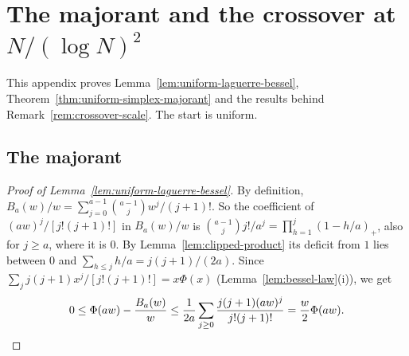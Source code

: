 \section{The majorant and the crossover at \texorpdfstring{$N/(\log N)^2$}{N/(log N)\^{}2}}
\label{app:boundary}

This appendix proves Lemma~\ref{lem:uniform-laguerre-bessel},
Theorem~\ref{thm:uniform-simplex-majorant} and the results behind
Remark~\ref{rem:crossover-scale}. The start is uniform.

\subsection{The majorant}

\begin{proof}[Proof of Lemma~\ref{lem:uniform-laguerre-bessel}]
By definition, $B_a(w)/w=\sum_{j=0}^{a-1}\binom{a-1}j w^j/(j+1)!$. So the
coefficient of $(aw)^j/[j!(j+1)!]$ in $B_a(w)/w$ is
$\binom{a-1}jj!/a^j=\prod_{h=1}^j(1-h/a)_+$, also for $j\ge a$, where it is $0$.
By Lemma~\ref{lem:clipped-product} its deficit from $1$ lies between $0$ and
$\sum_{h\le j}h/a=j(j+1)/(2a)$. Since $\sum_jj(j+1)x^j/[j!(j+1)!]=x\Phi(x)$
(Lemma~\ref{lem:bessel-law}(i)), we get
\[
0\le\Phi(aw)-\frac{B_a(w)}w
\le\frac1{2a}\sum_{j\ge0}\frac{j(j+1)(aw)^j}{j!(j+1)!}
=\frac w2\Phi(aw).\qedhere
\]
\end{proof}

